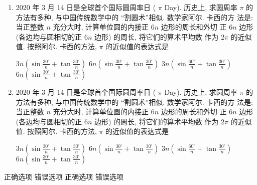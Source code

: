 \documentclass{ctexart}
\begin{document}
\begin{enumerate}
  \item 2020 年 3 月 14 日是全球首个国际圆周率日 ( $\pi$ Day). 历史上, 求圆周率 $\pi$ 的方法有多种, 与中国传统数学中的 “割圆术”相似. 数学家阿尔. 卡西的方 法是: 当正整数 $n$ 充分大时, 计算单位圆的内接正 $6 n$ 边形的周长和外切 正 $6 n$ 边形 (各边均与圆相切的正 $6 n$ 边形) 的周长, 将它们的算术平均数 作为 $2 \pi$ 的近似值. 按照阿尔. 卡西的方法, $\pi$ 的近似值的表达式是 \paren
    \begin{xchoice}[
      analysis-content = {
        It's obvious that A is false, then ...
      }
    ]
      \xitem
      $3 n(\sin \frac{30^{\circ}}{n}+\tan \frac{30^{\circ}}{n})$
      \xitem
      $6 n(\sin \frac{30^{\circ}}{n}+\tan \frac{30^{\circ}}{n})$
      \xitem*
      $3 n(\sin \frac{60^{\circ}}{n}+\tan \frac{30^{\circ}}{n})$
      \xitem
      $6 n(\sin \frac{30^{\circ}}{n}+\tan \frac{30^{\circ}}{n})$ 
    \end{xchoice}
  \item 2020 年 3 月 14 日是全球首个国际圆周率日 ( $\pi$ Day). 历史上, 求圆周率 $\pi$ 的方法有多种, 与中国传统数学中的 “割圆术”相似. 数学家阿尔. 卡西的方 法是: 当正整数 $n$ 充分大时, 计算单位圆的内接正 $6 n$ 边形的周长和外切 正 $6 n$ 边形 (各边均与圆相切的正 $6 n$ 边形) 的周长, 将它们的算术平均数 作为 $2 \pi$ 的近似值. 按照阿尔. 卡西的方法, $\pi$ 的近似值的表达式是 \paren
    \begin{xchoice}[
      analysis-content = {
        It's obvious that D is false, then ...
      }
    ]
      \xitem*
      $3 n(\sin \frac{30^{\circ}}{n}+\tan \frac{30^{\circ}}{n})$
      \xitem
      $6 n(\sin \frac{30^{\circ}}{n}+\tan \frac{30^{\circ}}{n})$
      \xitem*
      $3 n(\sin \frac{60^{\circ}}{n}+\tan \frac{30^{\circ}}{n})$
      \xitem
      $6 n(\sin \frac{30^{\circ}}{n}+\tan \frac{30^{\circ}}{n})$ 
    \end{xchoice}
\end{enumerate}

\begin{xchoice}[
  analysis-content = {
    It's obvious that D is false, then ...
  }
]
  \xitem* 正确选项
  \xitem  错误选项
  \xitem* 正确选项
  \xitem  错误选项
\end{xchoice}
\end{document}
